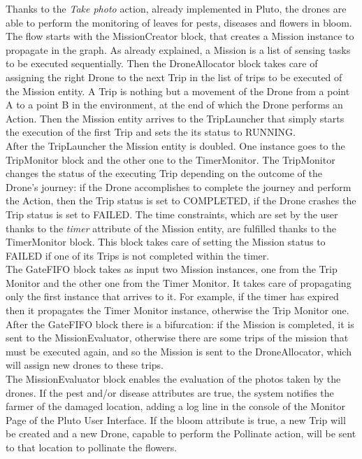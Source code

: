 Thanks to the \textit{Take photo} action, already implemented in Pluto, the drones are able to perform the monitoring of leaves for pests, diseases and flowers in bloom.
\\

The flow starts with the MissionCreator block, that creates a Mission instance to propagate in the graph.
As already explained, a Mission is a list of sensing tasks to be executed sequentially.
Then the DroneAllocator block takes care of assigning the right Drone to the next Trip in the list of trips to be executed of the Mission entity.
A Trip is nothing but a movement of the Drone from a point A to a point B in the environment, at the end of which the Drone performs an Action.
Then the Mission entity arrives to the TripLauncher that simply starts the execution of the first Trip and sets the its status to RUNNING.
\\

After the TripLauncher the Mission entity is doubled. One instance goes to the TripMonitor block and the other one to the TimerMonitor.
The TripMonitor changes the status of the executing Trip depending on the outcome of the Drone's journey:
if the Drone accomplishes to complete the journey and perform the Action, then the Trip status is set to COMPLETED,
if the Drone crashes the Trip status is set to FAILED.
The time constraints, which are set by the user thanks to the \textit{timer} attribute of the Mission entity, are fulfilled thanks to the TimerMonitor block.
This block takes care of setting the Mission status to FAILED if one of its Trips is not completed within the timer.
\\

The GateFIFO block takes as input two Mission instances, one from the Trip Monitor and the other one from the Timer Monitor.
It takes care of propagating only the first instance that arrives to it.
For example, if the timer has expired then it propagates the Timer Monitor instance, otherwise the Trip Monitor one.
\\

After the GateFIFO block there is a bifurcation:
if the Mission is completed, it is sent to the MissionEvaluator, otherwise there are some trips of the mission that must be executed again, and so the Mission is sent to the DroneAllocator, which will assign new drones to these trips.
\\

The MissionEvaluator block enables the evaluation of the photos taken by the drones. If the pest and/or disease attributes are true, the system notifies the farmer of the damaged location, adding a log line in the console of the Monitor Page of the Pluto User Interface.
If the bloom attribute is true, a new Trip will be created and a new Drone, capable to perform the Pollinate action, will be sent to that location to pollinate the flowers.
\\

